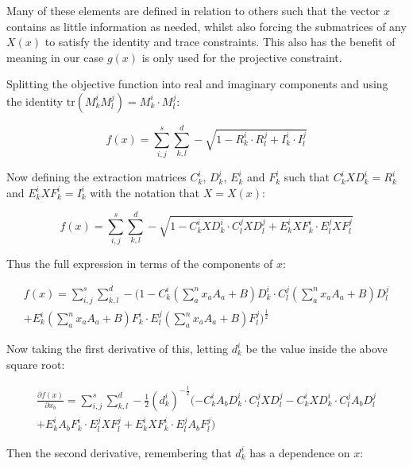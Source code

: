 \documentclass{article}
\begin{document}
Many of these elements are defined in relation to others such that the vector $x$ contains as little information as needed, whilst also forcing the submatrices of any $X(x)$ to satisfy the identity and trace constraints. This also has the benefit of meaning in our case $g(x)$ is only used for the projective constraint.

Splitting the objective function into real and imaginary components and using the identity $\text{tr}(M_k^i M_l^j) = M_k^i \cdot M_l^j$:

\begin{equation}
	f(x) = \sum_{i,j}^s \sum_{k,l}^d -\sqrt{1 - R_k^i \cdot R_l^j + I_k^i \cdot I_l^j}
\end{equation}

Now defining the extraction matrices $C_k^i$, $D_k^i$, $E_k^i$ and $F_k^i$ such that $C_k^i X D_k^i = R_k^i$ and $E_k^i X F_k^i = I_k^i$ with the notation that $X = X(x)$:

\begin{equation}
	f(x) = \sum_{i,j}^s \sum_{k,l}^d -\sqrt{1 - C_k^i X D_k^i \cdot C_l^j X D_l^j + E_k^i X F_k^i \cdot E_l^j X F_l^j} 
\end{equation}

Thus the full expression in terms of the components of $x$: 

\begin{align}
	f(x) = \sum_{i,j}^s \sum_{k,l}^d -\bigg(1 - C_k^i (\sum_a^n x_a A_a + B) D_k^i \cdot C_l^j (\sum_a^n x_a A_a + B) D_l^j \\
	+ E_k^i (\sum_a^n x_a A_a + B) F_k^i \cdot E_l^j (\sum_a^n x_a A_a + B) F_l^j\bigg)^{\frac{1}{2}} 
\end{align}

Now taking the first derivative of this, letting $d_k^i$ be the value inside the above square root:

\begin{align}
	\frac{\partial f(x)}{\partial x_b} = \sum_{i,j}^s \sum_{k,l}^d -\frac{1}{2}(d_k^i)^{-\frac{1}{2}}(-C_k^i A_b D_k^i \cdot C_l^j X D_l^j - C_k^i X D_k^i \cdot C_l^j A_b D_l^j \\
	+ E_k^i A_b F_k^i \cdot E_l^j X F_l^j + E_k^i X F_k^i \cdot E_l^j A_b F_l^j) 
\end{align}

Then the second derivative, remembering that $d_k^i$ has a dependence on $x$:
\end{document}
